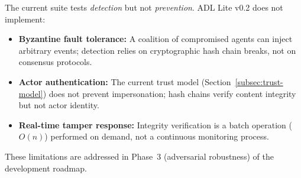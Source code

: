 The current suite tests \emph{detection} but not \emph{prevention}. ADL Lite v0.2 does not implement:
\begin{itemize}[leftmargin=2em]
    \item \textbf{Byzantine fault tolerance:} A coalition of compromised agents can inject arbitrary events; detection relies on cryptographic hash chain breaks, not on consensus protocols.
    \item \textbf{Actor authentication:} The current trust model (Section~\ref{subsec:trust-model}) does not prevent impersonation; hash chains verify content integrity but not actor identity.
    \item \textbf{Real-time tamper response:} Integrity verification is a batch operation ($O(n)$) performed on demand, not a continuous monitoring process.
\end{itemize}
These limitations are addressed in Phase~3 (adversarial robustness) of the development roadmap.

